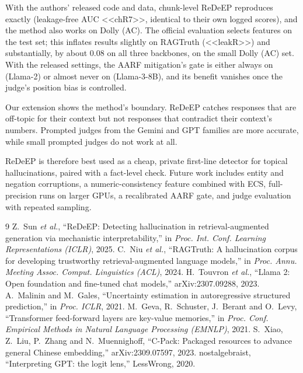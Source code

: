 \documentclass[conference]{IEEEtran}
\begin{document}
With the authors' released code and data, chunk-level ReDeEP reproduces exactly (leakage-free AUC <<chR7>>, identical to their own logged scores), and the method also works on Dolly (AC). The official evaluation selects features on the test set; this inflates results slightly on RAGTruth (<<leakR>>) and substantially, by about 0.08 on all three backbones, on the small Dolly (AC) set. With the released settings, the AARF mitigation's gate is either always on (Llama-2) or almost never on (Llama-3-8B), and its benefit vanishes once the judge's position bias is controlled.

Our extension shows the method's boundary. ReDeEP catches responses that are off-topic for their context but not responses that contradict their context's numbers. Prompted judges from the Gemini and GPT families are more accurate, while small prompted judges do not work at all.

ReDeEP is therefore best used as a cheap, private first-line detector for topical hallucinations, paired with a fact-level check. Future work includes entity and negation corruptions, a numeric-consistency feature combined with ECS, full-precision runs on larger GPUs, a recalibrated AARF gate, and judge evaluation with repeated sampling.

\begin{thebibliography}{9}
 Z.~Sun \emph{et al.}, ``ReDeEP: Detecting hallucination in retrieval-augmented generation via mechanistic interpretability,'' in \emph{Proc. Int. Conf. Learning Representations (ICLR)}, 2025.
 C.~Niu \emph{et al.}, ``RAGTruth: A hallucination corpus for developing trustworthy retrieval-augmented language models,'' in \emph{Proc. Annu. Meeting Assoc. Comput. Linguistics (ACL)}, 2024.
 H.~Touvron \emph{et al.}, ``Llama 2: Open foundation and fine-tuned chat models,'' arXiv:2307.09288, 2023.
 A.~Malinin and M.~Gales, ``Uncertainty estimation in autoregressive structured prediction,'' in \emph{Proc. ICLR}, 2021.
 M.~Geva, R.~Schuster, J.~Berant and O.~Levy, ``Transformer feed-forward layers are key-value memories,'' in \emph{Proc. Conf. Empirical Methods in Natural Language Processing (EMNLP)}, 2021.
 S.~Xiao, Z.~Liu, P.~Zhang and N.~Muennighoff, ``C-Pack: Packaged resources to advance general Chinese embedding,'' arXiv:2309.07597, 2023.
 nostalgebraist, ``Interpreting GPT: the logit lens,'' LessWrong, 2020.
\end{thebibliography}
\end{document}
